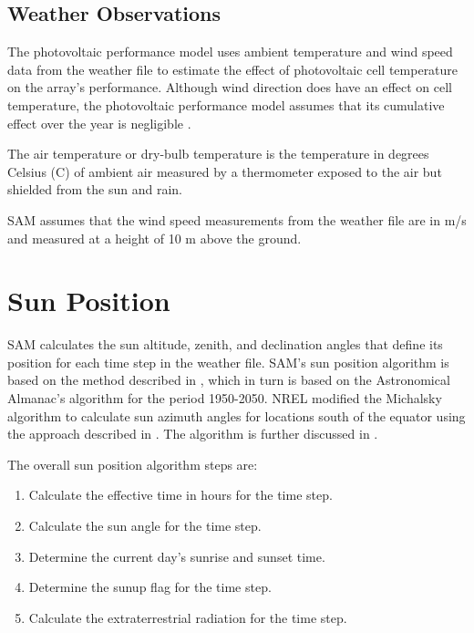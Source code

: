 \documentclass[12pt,letterpaper]{article}
\begin{document}
\section{Weather Observations}

The photovoltaic performance model uses ambient temperature and wind speed data from the weather file to estimate the effect of photovoltaic cell temperature on the array's performance. Although wind direction does have an effect on cell temperature, the photovoltaic performance model assumes that its cumulative effect over the year is negligible \citep{king2004}.

The air temperature or dry-bulb temperature is the temperature in degrees Celsius (\degree C) of ambient air measured by a thermometer exposed to the air but shielded from the sun and rain. 

SAM assumes that the wind speed measurements from the weather file are in m/s and measured at a height of 10 m above the ground.

\chapter{Sun Position}\label{sec-sunposition}

SAM calculates the sun altitude, zenith, and declination angles that define its position for each time step in the weather file. SAM's sun position algorithm is based on the method described in \citet{michalsky1988}, which in turn is based on the Astronomical Almanac's algorithm for the period 1950-2050. NREL modified the Michalsky algorithm to calculate sun azimuth angles for locations south of the equator using the approach described in \citep{iqbal1983}. The algorithm is further discussed in \citet{stackoverflow2012}.

The overall sun position algorithm steps are:
\begin{enumerate}
\item Calculate the effective time in hours for the time step.
\item Calculate the sun angle for the time step.
\item Determine the current day's sunrise and sunset time.
\item Determine the sunup flag for the time step.
\item Calculate the extraterrestrial radiation for the time step.
\end{enumerate}
\end{document}
